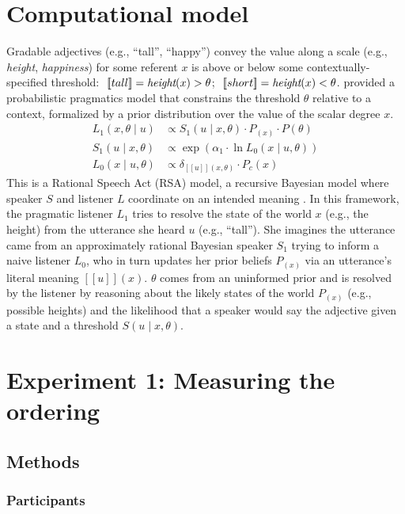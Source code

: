 \documentclass[10pt,letterpaper]{article}
\newcommand{\denote}[1]{\mbox{ $[\![ #1 ]\!]$}}
\begin{document}
\section{Computational model}

Gradable adjectives (e.g., ``tall'', ``happy'') convey the value along a scale (e.g., \emph{height}, \emph{happiness}) for some referent $x$ is above or below some contextually-specified threshold: $\denote{tall} = \emph{height}(x) > \theta$; $\denote{short} = \emph{height}(x) < \theta$.
 provided a probabilistic pragmatics model that constrains the threshold $\theta$ relative to a context, formalized by a prior distribution over the value of the scalar degree $x$.  
%
\begin{align}
L_{1}(x, \theta \mid u) &\propto S_{1}(u \mid x, \theta) \cdot P_(x) \cdot P(\theta) \label{eq:L1} \\
S_{1}(u \mid x, \theta) &\propto \exp{(\alpha_1 \cdot \ln {L_{0}(x \mid u, \theta)})} \label{eq:S1}\\
L_{0}(x \mid u, \theta) &\propto {\delta_{[\![u]\!](x, \theta)} \cdot P_{c}(x)} \label{eq:L0}
\end{align}
%
This is a Rational Speech Act (RSA) model, a recursive Bayesian model where speaker $S$ and listener $L$ coordinate on an intended meaning \cite<for a review, see >{Goodman2016:RSA}.
In this framework, the pragmatic listener $L_1$ tries to resolve the state of the world $x$ (e.g., the height) from the utterance she heard $u$ (e.g., ``tall'').
She imagines the utterance came from an approximately rational Bayesian speaker $S_1$ trying to inform a naive listener $L_0$, who in turn updates her prior beliefs $P_(x)$ via an utterance's literal meaning $[\![u]\!](x)$.
$\theta$ comes from an uninformed prior and is resolved by the listener by reasoning about the likely states of the world $P_(x)$ (e.g., possible heights) and the likelihood that a speaker would say the adjective given a state and a threshold $S(u \mid x, \theta)$.


\section{Experiment 1: Measuring the ordering}
\subsection{Methods}
\subsubsection{Participants}
\end{document}
